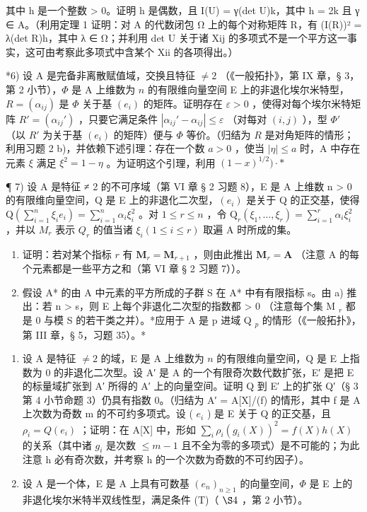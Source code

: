 其中 h 是一个整数 \textgreater{} 0。证明 h 是偶数，且 I(U) = γ(det U)k，其中 h = 2k 且 γ ∈ A。（利用定理 1 证明：对 A 的代数闭包 Ω 上的每个对称矩阵 R，有 (I(R))² = λ(det R)h，其中 λ ∈ Ω；并利用 det U 关于诸 Xij 的多项式不是一个平方这一事实，这可由考察此多项式中含某个 Xii 的各项得出。）

*6) 设 A 是完备非离散赋值域，交换且特征 \(\neq 2\) （《一般拓扑》，第 IX 章，§ 3，第 2 小节），\(\Phi\) 是 A 上维数为 \(n\) 的有限维向量空间 E 上的非退化埃尔米特型，\(R = (\alpha_{ij})\) 是 \(\Phi\) 关于基 \((e_i)\) 的矩阵。证明存在 \(\varepsilon > 0\) ，使得对每个埃尔米特矩阵 \(R' = (\alpha_{ij}')\) ，只要它满足条件 \(|\alpha_{ij}' - \alpha_{ij}| \leqslant \varepsilon\) （对每对 \((i, j)\) ），型 \(\Phi'\) （以 \(R'\) 为关于基 \((e_i)\) 的矩阵）便与 \(\Phi\) 等价。（归结为 \(R\) 是对角矩阵的情形；利用习题 2 b)，并依赖下述引理：存在一个数 \(a > 0\) ，使当 \(|\eta| \leqslant a\) 时，A 中存在元素 \(\xi\) 满足 \(\xi^2 = 1 - \eta\) 。为证明这个引理，利用 \((1 - x)^{1/2})\cdot *\)

¶ 7) 设 A 是特征 ≠ 2 的不可序域（第 VI 章 § 2 习题 8），E 是 A 上维数 n \textgreater{} 0 的有限维向量空间，Q 是 E 上的非退化二次型，\((e_i)\) 是关于 Q 的正交基，使得 \(\mathrm{Q}\left(\sum_{i=1}^{n}\xi_{i}e_{i}\right)=\sum_{i=1}^{n}\alpha_{i}\xi_{i}^{2}\) 。对 \(1\leqslant r\leqslant n\) ，令 \(\mathrm{Q}_{r}(\xi_{1},\ldots,\xi_{r})=\sum_{i=1}^{r}\alpha_{i}\xi_{i}^{2}\) ，并以 \(M_{r}\) 表示 \(Q_{r}\) 的值当诸 \(\xi_{i}\left(1\leqslant i\leqslant r\right)\) 取遍 A 时所成的集。

\begin{enumerate}
\def\labelenumi{\alph{enumi})}
\item
  证明：若对某个指标 \(r\) 有 \(\mathbf{M}_r = \mathbf{M}_{r+1}\) ，则由此推出 \(\mathbf{M}_r = \mathbf{A}\) （注意 A 的每个元素都是一些平方之和（第 VI 章 § 2 习题 7））。
\item
  假设 A* 的由 A 中元素的平方所成的子群 S 在 A* 中有有限指标 s。由 a) 推出：若 n \textgreater{} s，则 E 上每个非退化二次型的指数都 \textgreater{} 0 （注意每个集 M \(_{r}\) 都是 0 与模 S 的若干类之并）。*应用于 A 是 p 进域 Q \(_{p}\) 的情形（《一般拓扑》，第 III 章，§ 5，习题 35）。*
\end{enumerate}

\begin{enumerate}
\def\labelenumi{\arabic{enumi})}
\setcounter{enumi}{7}
\item
  设 A 是特征 \(\neq 2\) 的域，E 是 A 上维数为 \(n\) 的有限维向量空间，Q 是 E 上指数为 0 的非退化二次型。设 A′ 是 A 的一个有限奇次数代数扩张，E′ 是把 E 的标量域扩张到 A′ 所得的 A′ 上的向量空间。证明 Q 到 E′ 上的扩张 Q′（§ 3 第 4 小节命题 3）仍具有指数 0。（归结为 A′ = A{[}X{]}/(f) 的情形，其中 f 是 A 上次数为奇数 m 的不可约多项式。设 ( \(e_i\) ) 是 E 关于 Q 的正交基，且 \(\rho_i = Q(e_i)\) ；证明：在 A{[}X{]} 中，形如 \(\sum_{i} \rho_i(g_i(X))^2 = f(X)h(X)\) 的关系（其中诸 \(g_i\) 是次数 \(\leqslant m - 1\) 且不全为零的多项式）是不可能的；为此注意 h 必有奇次数，并考察 h 的一个次数为奇数的不可约因子）。
\item
  设 A 是一个体，E 是 A 上具有可数基 \((e_n)_{n\geqslant 1}\) 的向量空间，\(\Phi\) 是 E 上的非退化埃尔米特半双线性型，满足条件 (T)（ \(\S 4\) ，第 2 小节）。
\end{enumerate}

